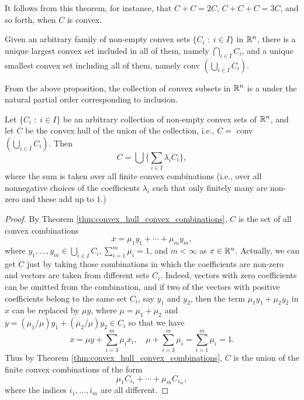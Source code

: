 \documentclass[11pt,a4paper]{article}
\begin{document}
\begin{remark}
    It follows from this theorem, for instance, that $C+C = 2C$, $C+C+C = 3C$, and so forth, when $C$ is convex.
\end{remark}

\begin{proposition}
    Given an arbitrary family of non-empty convex sets $\{C_i\;:\;i\in I\}$ in $\mathbb{R}^n$, there is a unique largest convex set included in all of them, namely $\bigcap_{i\in I}C_i$, and a unique smallest convex set including all of them, namely conv $(\bigcup_{i\in I} C_i)$.
\end{proposition}

\begin{remark}
    From the above proposition, the collection of convex subsets in $\mathbb{R}^n$ is a   under the natural partial order corresponding to inclusion.
\end{remark}

\begin{theorem}\label{thm:convex_hull_finite_convex_combinations}
    Let $\{C_i\;:\;i\in I\}$ be an arbitrary collection of non-empty convex sets of $\mathbb{R}^n$, and let $C$ be the convex hull of the union of the collection, i.e., $C =$ conv $(\bigcup_{i\in I}C_i)$. Then
    \begin{equation*}
        C = \bigcup\Big\{\sum_{i\in I}\lambda_i C_i\Big\},
    \end{equation*}
    where the sum is taken over all finite convex combinations (i.e., over all nonnegative choices of the coefficients $\lambda_i$ such that only finitely many are non-zero and these add up to $1$.)
\end{theorem}

\begin{proof}
    By Theorem \ref{thm:convex_hull_convex_combinations}, $C$ is the set of all convex combinations 
    \begin{equation*}
        x = \mu_1 y_1+\cdots + \mu_m y_m,
    \end{equation*}
    where $y_1,\ldots,y_m\in \bigcup_{i\in I} C_i, \sum_{i=1}^m \mu_i = 1$, and $m<\infty$ as $x\in\mathbb{R}^n$. Actually, we can get $C$ just by taking those combinations in which the coefficients are non-zero and vectors are taken from different sets $C_i$. Indeed, vectors with zero coefficients can be omitted from the combination, and if two of the vectors with positive coefficients belong to the same set $C_i$, say $y_1$ and $y_2$, then the term $\mu_1 y_1+\mu_2 y_2$ in $x$ can be replaced by $\mu y$, where $\mu = \mu_1+\mu_2$ and $y = (\mu_1/\mu)y_1 + (\mu_2/\mu)y_2\in C_i$ so that we have
    \begin{equation*}
        x = \mu y + \sum_{i=3}^m \mu_i x_i,\quad \mu+\sum_{i=3}^m \mu_i = \sum_{i=1}^m \mu_i = 1. 
    \end{equation*}
    Thus by Theorem \ref{thm:convex_hull_convex_combinations}, $C$ is the union of the finite convex combinations of the form 
    \begin{equation*}
        \mu_1 C_{i_1} + \cdots + \mu_m C_{i_m},
    \end{equation*} 
    where the indices $i_1,\ldots,i_m$ are all different. 
\end{proof}
\end{document}
